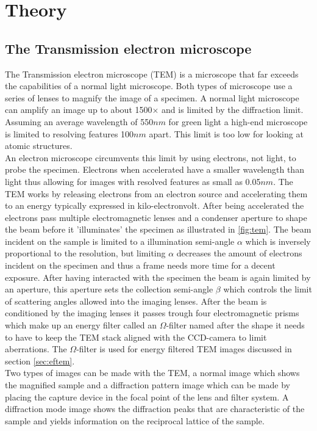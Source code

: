 \section{Theory}
\subsection{The Transmission electron microscope}
The Transmission electron microscope (TEM) is a microscope that far exceeds the capabilities of a normal light microscope. Both types of microscope use a series of lenses to magnify the image of a specimen.
A normal light microscope can amplify an image up to about 1500$\times$ and is limited by the diffraction limit. Assuming an average wavelength of 550$nm$ for green light a high-end microscope is limited to resolving features 100$nm$ apart.
This limit is too low for looking at atomic structures.\cite{PhysRevLett.106.193905}\\
An electron microscope circumvents this limit by using electrons, not light, to probe the specimen. Electrons when accelerated have a smaller wavelength than light thus allowing for images with resolved features as small as 0.05$nm$. \cite{kisielowski_freitag_bischoff_van}
The TEM works by releasing electrons from an electron source and accelerating them to an energy typically expressed in kilo-electronvolt. After being accelerated the electrons pass multiple electromagnetic lenses and a condenser aperture to shape the beam before it 'illuminates' the specimen as illustrated in \ref{fig:tem}.
The beam incident on the sample is limited to a illumination semi-angle $\alpha$ which is inversely proportional to the resolution, but limiting $\alpha$ decreases the amount of electrons incident on the specimen and thus a frame needs more time for a decent exposure.
After having interacted with the specimen the beam is again limited by an aperture, this aperture sets the collection semi-angle $\beta$ which controls the limit of scattering angles allowed into the imaging lenses.
After the beam is conditioned by the imaging lenses it passes trough four electromagnetic prisms which make up an energy filter called an $\Omega$-filter named after the shape it needs to have to keep the TEM stack aligned with the CCD-camera to limit aberrations.
The $\Omega$-filter is used for energy filtered TEM images discussed in section \ref{sec:eftem}.\\
Two types of images can be made with the TEM, a normal image which shows the magnified sample and a diffraction pattern image which can be made by placing the capture device in the focal point of the lens and filter system.
A diffraction mode image shows the diffraction peaks that are characteristic of the sample and yields information on the reciprocal lattice of the sample. \cite{Egerton_2008}


